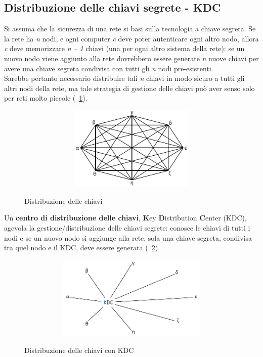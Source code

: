 \subsection{Distribuzione delle chiavi segrete - KDC}
Si assuma che la sicurezza di una rete si basi sulla tecnologia a chiave segreta. Se la rete ha \textit{n} nodi, e ogni computer \textit{c} deve poter autenticare ogni altro nodo, allora \textit{c} deve memorizzare \textit{n – 1} chiavi (una per ogni altro sistema della rete): se un nuovo nodo viene aggiunto alla rete dovrebbero essere generate \textit{n} nuove chiavi per avere una chiave segreta condivisa con tutti gli \textit{n} nodi pre-esistenti. \\
Sarebbe pertanto necessario distribuire tali \textit{n} chiavi in modo sicuro a tutti gli altri nodi della rete, ma tale strategia di gestione delle chiavi può aver senso solo per reti molto piccole (\figurename~\ref{fig:ImgS50}). \newline \newline
\begin{figure}[htbp]
	\centering%
	\subfigure%
	{\includegraphics[height=4cm, width=12cm, keepaspectratio]{Immagini/autenticazione/ImgS50.png}}
	\caption{Distribuzione delle chiavi\label{fig:ImgS50}} 	
\end{figure}
Un \textbf{centro di distribuzione delle chiavi}, \textbf{K}ey \textbf{D}istribution \textbf{C}enter (KDC), agevola la gestione/distribuzione delle chiavi segrete: conosce le chiavi di tutti i nodi e se un nuovo nodo si aggiunge alla rete, sola una chiave segreta, condivisa tra quel nodo e il KDC, deve essere generata (\figurename~\ref{fig:ImgS52}). 
\begin{figure}[htbp]
	\centering%
	\subfigure%
	{\includegraphics[height=4cm, width=12cm, keepaspectratio]{Immagini/autenticazione/ImgS52.png}}
	\caption{Distribuzione delle chiavi con KDC\label{fig:ImgS52}} 	
\end{figure}


